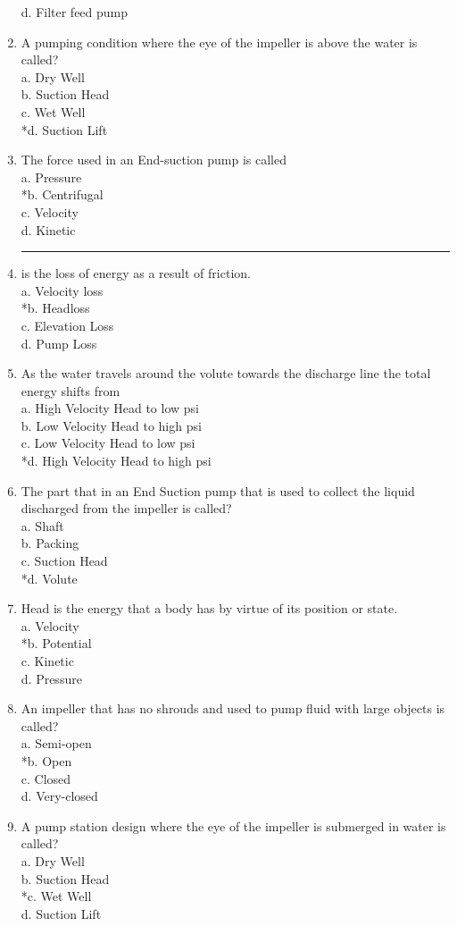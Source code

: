 \begin{enumerate}[1.]
d. Filter feed pump\\
\item A pumping condition where the eye of the impeller is above the water is called?\\
a. Dry Well\\
b. Suction Head\\
c. Wet Well\\
*d. Suction Lift\\
\item The force used in an End-suction pump is called\\
a. Pressure\\
*b. Centrifugal\\
c. Velocity\\
d. Kinetic\\
\item \rule{1.5cm}{0.5pt} is the loss of energy as a result of friction.\\
a. Velocity loss\\
*b. Headloss\\
c. Elevation Loss\\
d. Pump Loss\\
\item As the water travels around the volute towards the discharge line the total energy shifts from\\
a. High Velocity Head to low psi\\
b. Low Velocity Head to high psi\\
c. Low Velocity Head to low psi\\
*d. High Velocity Head to high psi\\
\item The part that in an End Suction pump that is used to collect the liquid discharged from the impeller is called?\\
a. Shaft\\
b. Packing\\
c. Suction Head\\
*d. Volute\\
\item Head is the energy that a body has by virtue of its position or state.\\
a. Velocity\\
*b. Potential\\
c. Kinetic\\
d. Pressure\\
\item An impeller that has no shrouds and used to pump fluid with large objects is called?\\
a. Semi-open\\
*b. Open\\
c. Closed\\
d. Very-closed\\
\item A pump station design where the eye of the impeller is submerged in water is called?\\
a. Dry Well\\
b. Suction Head\\
*c. Wet Well\\
d. Suction Lift\\

\end{enumerate}
